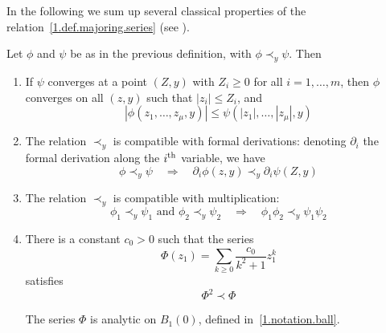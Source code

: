 \documentclass[AHL,Unicode,longabstracts,published]{cedram}
\theoremstyle{plain}
\newcommand{\dptl}{\partial}%
\newcommand*\dsp{\displaystyle}
\begin{document}
In the following we sum up several classical properties of the relation~\eqref{1.def.majoring.series} (see \cite{cartan1995theorie}).

\begin{lemm}\label{1.majoring.properties}
Let $\phi$ and $\psi$ be as in the previous definition, with $\phi \prec_{y} \psi$. Then
\begin{enumerate}
\item If $\psi$ converges at a point $(Z,y)$ with $Z_i \geq 0$ for all $i=1,\ldots,m$, then $\phi$ converges on all $(z,y)$ such that $|z_i|\leq Z_i$, and
\begin{equation} 
|\phi(z_1,\ldots,z_{\mu},y)| \leq \psi(|z_1|,\ldots,|z_{\mu}|,y)
\end{equation}

\item The relation $\prec_{y}$ is compatible with formal derivations: denoting $\dptl_{i}$ the formal derivation along the $i^{\rm th}$ variable, we have
\begin{equation}
\phi \prec_{y} \psi \quad \Longrightarrow \quad \dptl_{i}\phi(z,y) \prec_{y} \dptl_{i}\psi(Z,y)
\end{equation}

\item The relation $\prec_{y}$ is compatible with multiplication:
\begin{equation}
\phi_1 \prec_{y} \psi_1 \text{ and } \phi_2 \prec_{y} \psi_2 \quad \Longrightarrow \quad \phi_1 \phi_2 \prec_{y} \psi_1\psi_2
\end{equation}

\item There is a constant $c_0>0$ such that the series
\begin{equation}\label{1.defi.Phi}
\Phi(z_1) = \sum_{k \geq 0} \frac{\dsp c_0}{\dsp k^2+1} z_1^{k}
\end{equation}
satisfies
\begin{equation}\label{1.Phi2}
\Phi^2 \prec \Phi
\end{equation}

The series $\Phi$ is analytic on $B_{1}(0)$, defined in~\eqref{1.notation.ball}.
\end{enumerate}
\end{lemm}
\end{document}
